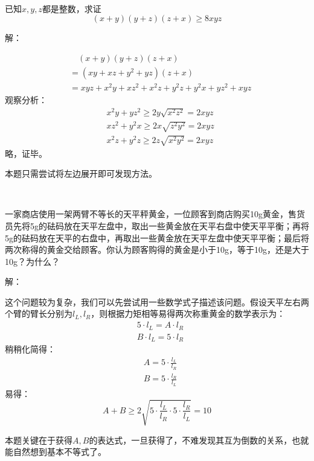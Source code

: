 ~

\begin{example}
已知$x,y,z$都是整数，求证
\[
\left( x+y \right) \left( y+z \right) \left( z+x \right) \geqslant 8xyz
\]
\end{example}

解：

\begin{align*}
&\quad \left( x+y \right) \left( y+z \right) \left( z+x \right) \\
&=\left( xy+xz+y^2+yz \right) \left( z+x \right) \\
&=xyz+x^2y+xz^2+x^2z+y^2z+y^2x+yz^2+xyz
\end{align*}
观察分析：
\begin{align*}
&x^2y+yz^2\geqslant 2y\sqrt{x^2z^2}=2xyz \\
&xz^2+y^2x\geqslant 2x\sqrt{z^2y^2}=2xyz \\
&x^2z+y^2z\geqslant 2z\sqrt{x^2y^2}=2xyz
\end{align*}
略，证毕。

\begin{tcolorbox}
本题只需尝试将左边展开即可发现方法。
\end{tcolorbox}

~

\begin{example}
一家商店使用一架两臂不等长的天平秤黄金，一位顾客到商店购买10g黄金，售货员先将5g的砝码放在天平左盘中，取出一些黄金放在天平右盘中使天平平衡；再将5g的砝码放在天平的右盘中，再取出一些黄金放在天平左盘中使天平平衡；最后将两次称得的黄金交给顾客。你认为顾客购得的黄金是小于10g，等于10g，还是大于10g？为什么？
\end{example}

解：

这个问题较为复杂，我们可以先尝试用一些数学式子描述该问题。假设天平左右两个臂的臂长分别为$l_L,l_R$，则根据力矩相等易得两次称重黄金的数学表示为：
\begin{align*}
&5\cdot l_L=A\cdot l_R \\
&B\cdot l_L=5\cdot l_R
\end{align*}
稍稍化简得：
\begin{align*}
&A=5\cdot \frac{l_L}{l_R} \\
&B=5\cdot \frac{l_R}{l_L}
\end{align*}
易得：
\[
A+B\geqslant 2\sqrt{5\cdot \frac{l_L}{l_R}\cdot 5\cdot \frac{l_R}{l_L}}=10
\]

\begin{tcolorbox}
本题关键在于获得$A,B$的表达式，一旦获得了，不难发现其互为倒数的关系，也就能自然想到基本不等式了。
\end{tcolorbox}

